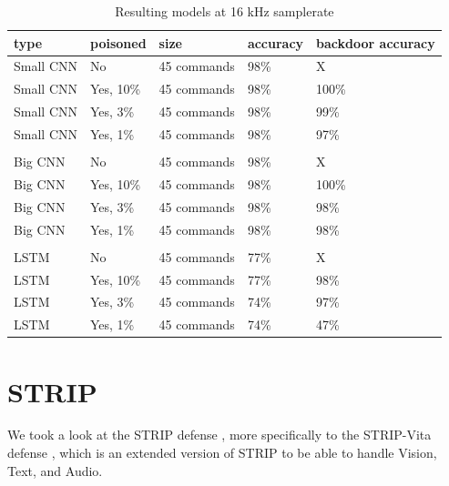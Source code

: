 \documentclass{report}
\theoremstyle{definition}
\theoremstyle{remark}
\begin{document}
\begin{table}[!hbt]
\centering
\begin{tabular}{|l|l|l|l|l|}
\hline
type & poisoned & size & accuracy &   backdoor accuracy \\ \hline
Small CNN & No  &  45 commands  &   98\%  & X     \\ \hline
Small CNN & Yes, 10\%  &  45 commands  &  98\% & 100\%        \\ \hline
Small CNN & Yes, 3\%  &  45 commands  &  98\%  & 99\%     \\ \hline
Small CNN & Yes, 1\%  &  45 commands  &  98\%  & 97\%     \\ \hline
 &  &  &  &  \\ \hline
Big CNN & No  &  45 commands  &   98\%  & X     \\ \hline
Big CNN & Yes, 10\%  &  45 commands  &  98\% & 100\%        \\ \hline
Big CNN & Yes, 3\%  &  45 commands  &  98\%  & 98\%     \\ \hline
Big CNN & Yes, 1\%  &  45 commands  &  98\%  & 98\%     \\ \hline
 &  &  &  &  \\ \hline
LSTM & No  &  45 commands  &   77\%  & X     \\ \hline
LSTM & Yes, 10\%  &  45 commands  &  77\% & 98\%        \\ \hline
LSTM & Yes, 3\%  &  45 commands  &  74\%  & 97\%     \\ \hline
LSTM & Yes, 1\%  &  45 commands  &  74\%  & 47\%     \\ \hline
\end{tabular}
\caption{Resulting models at 16 kHz samplerate}
\end{table}

\section{STRIP \label{STRIP}}
We took a look at the STRIP defense \cite{Strip}, more specifically to the STRIP-Vita defense \cite{StripVita}, which is an extended version of STRIP to be able to handle Vision, Text, and Audio.
\end{document}
